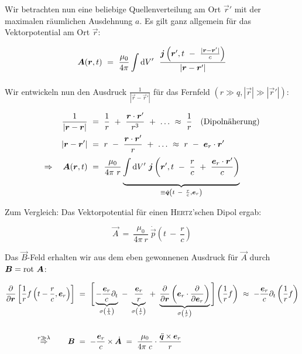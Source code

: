 Wir betrachten nun eine beliebige Quellenverteilung am Ort $\vec{r}'$ mit der maximalen räumlichen Ausdehnung $a$. Es gilt ganz allgemein für das Vektorpotential am Ort $\vec{r}$:

\begin{equation*}
\vec{A}(\vec{r},t) \ = \ \frac{\mu_0}{4\pi}\Int{}{}{V'} \ \frac{\vec{j}\left(\vec{r}',t\ - \ \frac{|\vec{r}-\vec{r}'|}{c}\right)}{|\vec{r}-\vec{r}'|}
\end{equation*}

Wir entwickeln nun den Ausdruck $\frac{1}{|\vec{r}-\vec{r}'|}$ für das Fernfeld $(r\gg q, |\vec{r}| \gg |\vec{r}'|)$:

\begin{align*}
\frac{1}{|\vec{r}-\vec{r}|}  \ &= \ \frac{1}{r} \ + \ \frac{\vec{r}\cdot\vec{r}'}{r^3} \ + \ \ldots \ \approx \ \frac{1}{r} \quad \text{(Dipolnäherung)}\\
|\vec{r}-\vec{r}'|  \ &= \ r \ - \ \frac{\vec{r}\cdot\vec{r}'}{r} \ + \ \ldots \ \approx \ r \ - \ \vec{e}_r \cdot \vec{r}'\\
\Rightarrow \quad \vec{A}(\vec{r},t)  \ &= \ \frac{\mu_0}{4\pi \ r} \underbrace{\Int{}{}{V'} \vec{j} \left(\vec{r}',t \ - \ \frac{r}{c} \ + \ \frac{\vec{e}_r\cdot\vec{r}'}{c}\right)}_{\equiv \dot{\vec{q}}\left(t \ - \ \frac{r}{c},\vec{e}_r\right)}
\end{align*}

Zum Vergleich: Das Vektorpotential für einen \textsc{Hertz}'schen Dipol ergab:

\begin{equation*}
\vec{A}  \ = \ \frac{\mu_0}{4\pi \ r} \ \dot{\vec{p}}\left(t \ - \ \frac{r}{c}\right)
\end{equation*}

Das $\vec{B}$-Feld erhalten wir aus dem eben gewonnenen Ausdruck für $\vec{A}$ durch $\bm{B}=\text{rot }\bm{A}$:

\begin{align*}
\pdiff{}{\vec{r}}\left[\frac{1}{r} f \left(t-\frac{r}{c},\vec{e}_r\right)\right] \ &= \ \Bigg[\underbrace{-\frac{\vec{e}_r}{c}\partial_t}_{\sigma\left(\frac{1}{\lambda}\right)} \ - \ \underbrace{\frac{\vec{e}_r}{r}}_{\sigma\left(\frac{1}{r}\right)} \ + \ \underbrace{\pdiff{}{\vec{r}}\left(\vec{e}_r\cdot\pdiff{}{\vec{e}_r}\right)}_{\sigma\left(\frac{1}{r}\right)}\Bigg ] \left(\frac{1}{r}f\right) \ \approx \ - \frac{\vec{e}_r}{c} \partial_t \left(\frac{1}{r}f\right)\\
\ \\
\overset{r\gg\lambda}{\Rightarrow} \qquad \vec{B}  \ &= \ -\frac{\vec{e}_r}{c}\times\dot{\vec{A}}  \ = \  \frac{\mu_0}{4\pi \ c} \cdot \frac{\ddot{\vec{q}}\times\vec{e}_r}{r}
\end{align*}

